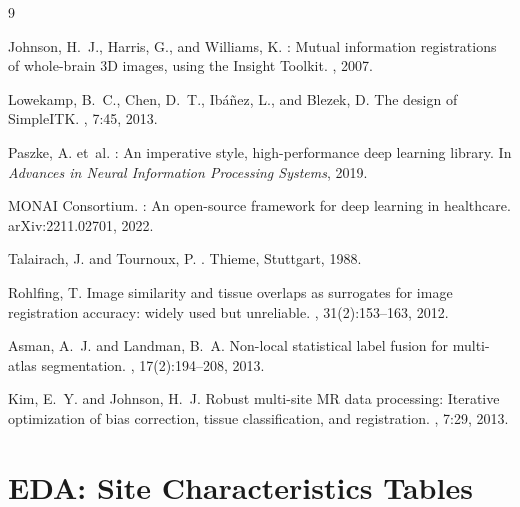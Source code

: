 \documentclass[11pt,letterpaper]{article}
\begin{document}
\begin{thebibliography}{9}

Johnson, H.~J., Harris, G., and Williams, K.
: Mutual information registrations of whole-brain {3D}
  images, using the {Insight Toolkit}.
, 2007.

Lowekamp, B.~C., Chen, D.~T., Ib\'{a}\~{n}ez, L., and Blezek, D.
\newblock The design of {SimpleITK}.
, 7:45, 2013.

Paszke, A. et~al.
: An imperative style, high-performance deep learning library.
\newblock In {\em Advances in Neural Information Processing Systems}, 2019.

{MONAI Consortium}.
: An open-source framework for deep learning in healthcare.
\newblock arXiv:2211.02701, 2022.

Talairach, J. and Tournoux, P.
.
\newblock Thieme, Stuttgart, 1988.

Rohlfing, T.
\newblock Image similarity and tissue overlaps as surrogates for image
  registration accuracy: widely used but unreliable.
, 31(2):153--163, 2012.

Asman, A.~J. and Landman, B.~A.
\newblock Non-local statistical label fusion for multi-atlas segmentation.
, 17(2):194--208, 2013.

Kim, E.~Y. and Johnson, H.~J.
\newblock Robust multi-site {MR} data processing: Iterative optimization of
  bias correction, tissue classification, and registration.
, 7:29, 2013.

\end{thebibliography}

\newpage
\appendix
\renewcommand{\thesection}{Appendix~\Alph{section}}

\section{EDA: Site Characteristics Tables}
\label{app:eda}
\end{document}
